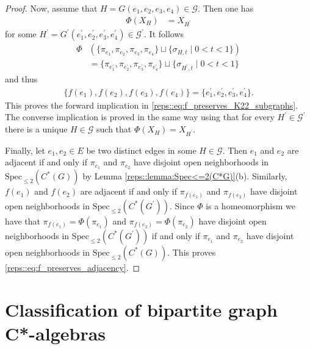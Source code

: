 \documentclass[a4paper]{amsart}
\begin{document}
\begin{proof}
    Now, assume that $H = G(e_1, e_2, e_3, e_4) \in \mathcal{G}$. Then one has
    \begin{align*}
        \Phi(X_H) &= X_{H^\prime}
    \end{align*}
    for some $H^\prime = G^\prime(e_1^\prime, e_2^\prime, e_3^\prime, e_4^\prime) \in \mathcal{G}^\prime$. It follows
    \begin{align*}
        \Phi&\left( \{ \pi_{e_1}, \pi_{e_2}, \pi_{e_3}, \pi_{e_4} \} \sqcup \{ \sigma_{H,t} \mid 0 < t < 1\} \right) \\
            &= \{ \pi_{e_1^\prime}, \pi_{e_2^\prime}, \pi_{e_3^\prime}, \pi_{e_4^\prime} \} \sqcup \{ \sigma_{H^\prime, t} \mid 0 < t < 1\}
    \end{align*}
    and thus
    \begin{align*}
        \{f(e_1), f(e_2), f(e_3), f(e_4)\} = \{e_1^\prime, e_2^\prime, e_3^\prime, e_4^\prime\}.
    \end{align*}
    This proves the forward implication in \eqref{reps::eq:f_preserves_K22_subgraphs}. The converse implication is proved in the same way using that for every $H^\prime \in \mathcal{G}^\prime$ there is a unique $H \in \mathcal{G}$ such that $\Phi(X_H) = X_{H^\prime}$.

    Finally, let $e_1, e_2 \in E$ be two distinct edges in some $H \in \mathcal{G}$. Then $e_1$ and $e_2$ are adjacent if and only if $\pi_{e_1}$ and $\pi_{e_2}$ have disjoint open neighborhoods in $\mathrm{Spec}_{\leq 2}(C^\ast(G))$ by Lemma \ref{reps::lemma:Spec<=2(C*G)}(b). Similarly, $f(e_1)$ and $f(e_2)$ are adjacent if and only if $\pi_{f(e_1)}$ and $\pi_{f(e_2)}$ have disjoint open neighborhoods in $\mathrm{Spec}_{\leq 2}(C^\ast(G^\prime))$. Since $\Phi$ is a homeomorphism we have that $\pi_{f(e_1)} = \Phi(\pi_{e_1})$ and $\pi_{f(e_2)} = \Phi(\pi_{e_2})$ have disjoint open neighborhoods in $\mathrm{Spec}_{\leq 2}(C^\ast(G^\prime))$ if and only if $\pi_{e_1}$ and $\pi_{e_2}$ have disjoint open neighborhoods in $\mathrm{Spec}_{\leq 2}(C^\ast(G))$. This proves \eqref{reps::eq:f_preserves_adjacency}.
\end{proof}

\section{Classification of bipartite graph C*-algebras}
\label{sec::classification}
\end{document}
